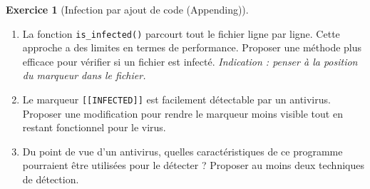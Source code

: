 \documentclass[a4paper,11pt]{article}
\theoremstyle{plain}
\theoremstyle{definition}
\newtheorem{exercice}{Exercice}
\begin{document}
\begin{exercice}[Infection par ajout de code (Appending)]
\begin{enumerate}
\item La fonction \texttt{is\_infected()} parcourt tout le fichier ligne par ligne. Cette approche a des limites en termes de performance. Proposer une méthode plus efficace pour vérifier si un fichier est infecté.
\textit{Indication : penser à la position du marqueur dans le fichier.}

\item Le marqueur \texttt{[[INFECTED]]} est facilement détectable par un antivirus. Proposer une modification pour rendre le marqueur moins visible tout en restant fonctionnel pour le virus.

\item Du point de vue d'un antivirus, quelles caractéristiques de ce programme pourraient être utilisées pour le détecter ? Proposer au moins deux techniques de détection.
\end{enumerate}

\end{exercice}
\end{document}
